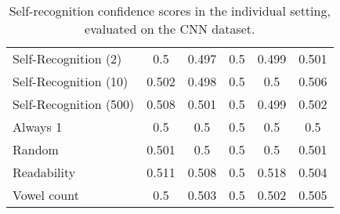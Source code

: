\begin{table}[h]
\begin{tabular}{l|ccccc}
        Self-Recognition (2)                       & 0.5        & 0.497      & 0.5        & 0.499      & 0.501      \\
        Self-Recognition (10)                      & 0.502      & 0.498      & 0.5        & 0.5        & 0.506      \\
        Self-Recognition (500)                     & 0.508      & 0.501      & 0.5        & 0.499      & 0.502      \\
        Always 1                           & 0.5        & 0.5        & 0.5        & 0.5        & 0.5        \\
        Random                             & 0.501      & 0.5        & 0.5        & 0.5        & 0.501      \\
        Readability                        & 0.511      & 0.508      & 0.5        & 0.518      & 0.504      \\
        Vowel count                        & 0.5        & 0.503      & 0.5        & 0.502      & 0.505      \\
    \end{tabular}

    \caption{Self-recognition confidence scores in the individual setting, evaluated on the CNN dataset.}
    \label{table:individual_self_rec_cnn}
\end{table}

